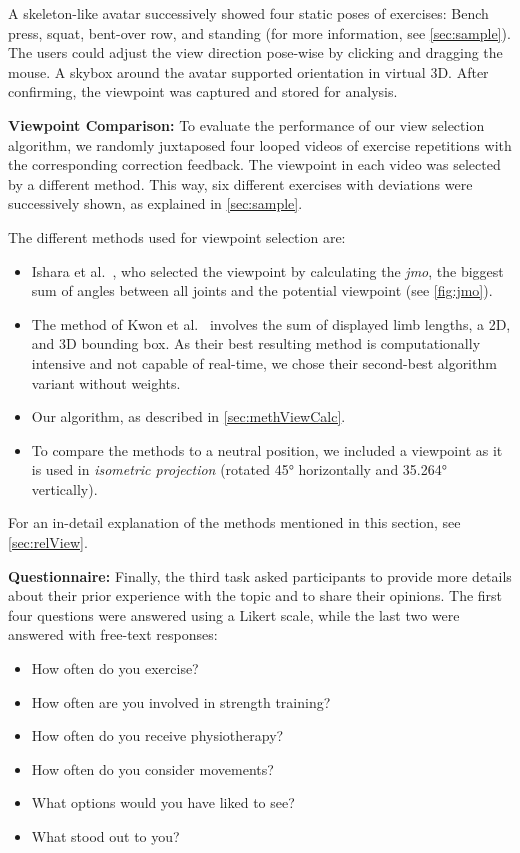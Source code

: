 A skeleton-like avatar successively showed four static poses of exercises: Bench press, squat, bent-over row, and standing (for more information, see \autoref{sec:sample}). The users could adjust the view direction pose-wise by clicking and dragging the mouse. A skybox around the avatar supported orientation in virtual 3D. After confirming, the viewpoint was captured and stored for analysis.

\textbf{Viewpoint Comparison:} To evaluate the performance of our view selection algorithm, we randomly juxtaposed four looped videos of exercise repetitions with the corresponding correction feedback. The viewpoint in each video was selected by a different method. This way, six different exercises with deviations were successively shown, as explained in \autoref{sec:sample}.  

The different methods used for viewpoint selection are:
\begin{itemize}
	\setlength{\itemsep}{-0.3cm}
	\item Ishara et al.~\cite{ishara2015mra}, who selected the viewpoint by calculating the \emph{\acrshort{jmo}}, the biggest sum of angles between all joints and the potential viewpoint (see \autoref{fig:jmo}).
	\item The method of Kwon et al.~\cite{kwon2020ocp} involves the sum of displayed limb lengths, a 2D, and 3D bounding box. As their best resulting method is computationally intensive and not capable of real-time, we chose their second-best algorithm variant without weights.
	\item Our algorithm, as described in \autoref{sec:methViewCalc}.
	\item  To compare the methods to a neutral position, we included a viewpoint as it is used in \emph{isometric projection} (rotated 45° horizontally and 35.264° vertically).
\end{itemize}
For an in-detail explanation of the methods mentioned in this section, see \autoref{sec:relView}.

\textbf{Questionnaire:} Finally, the third task asked participants to provide more details about their prior experience with the topic and to share their opinions. The first four questions were answered using a Likert scale, while the last two were answered with free-text responses:

\begin{itemize}
	\setlength{\itemsep}{-0.3cm}
	\item How often do you exercise?
	\item How often are you involved in strength training?
	\item How often do you receive physiotherapy? 
	\item How often do you consider movements?
	\item What options would you have liked to see?
	\item What stood out to you?
\end{itemize} 


